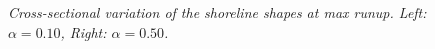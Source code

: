 \documentclass[review, authoryear]{elsarticle}
\begin{document}
\begin{figure}[]
        \centering
        \caption{\textit{Cross-sectional variation of the shoreline shapes at max runup. Left: $\alpha=0.10$, Right: $\alpha=0.50$.}}
        \label{fig:max_runup}
\end{figure}
\end{document}
